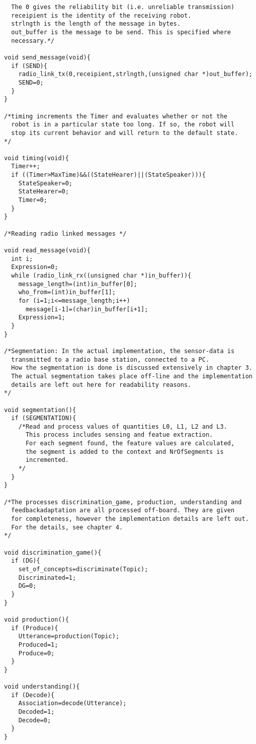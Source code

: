 \begin{lstlisting}
  The 0 gives the reliability bit (i.e. unreliable transmission)
  receipient is the identity of the receiving robot.
  strlngth is the length of the message in bytes.
  out_buffer is the message to be send. This is specified where
  necessary.*/

void send_message(void){
  if (SEND){
    radio_link_tx(0,receipient,strlngth,(unsigned char *)out_buffer);
    SEND=0;
  }
}

/*timing increments the Timer and evaluates whether or not the
  robot is in a particular state too long. If so, the robot will
  stop its current behavior and will return to the default state.
*/

void timing(void){
  Timer++;
  if ((Timer>MaxTime)&&((StateHearer)||(StateSpeaker))){
    StateSpeaker=0;
    StateHearer=0;
    Timer=0;
  }
}

/*Reading radio linked messages */

void read_message(void){
  int i;
  Expression=0;
  while (radio_link_rx((unsigned char *)in_buffer)){
    message_length=(int)in_buffer[0];
    who_from=(int)in_buffer[1];
    for (i=1;i<=message_length;i++)
      message[i-1]=(char)in_buffer[i+1];
    Expression=1;
  }
}

/*Segmentation: In the actual implementation, the sensor-data is
  transmitted to a radio base station, connected to a PC. 
  How the segmentation is done is discussed extensively in chapter 3.
  The actual segmentation takes place off-line and the implementation 
  details are left out here for readability reasons.
*/

void segmentation(){
  if (SEGMENTATION){
    /*Read and process values of quantities L0, L1, L2 and L3.
      This process includes sensing and featue extraction.
      For each segment found, the feature values are calculated,
      the segment is added to the context and NrOfSegments is 
      incremented.
    */
  }
}

/*The processes discrimination_game, production, understanding and
  feedbackadaptation are all processed off-board. They are given 
  for completeness, however the implementation details are left out. 
  For the details, see chapter 4.
*/

void discrimination_game(){
  if (DG){
    set_of_concepts=discriminate(Topic);
    Discriminated=1;
    DG=0;
  }
}

void production(){
  if (Produce){
    Utterance=production(Topic);
    Produced=1;
    Produce=0;
  }
}

void understanding(){
  if (Decode){
    Association=decode(Utterance);
    Decoded=1;
    Decode=0;
  }
}


\end{lstlisting}
